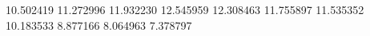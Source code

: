 10.502419
11.272996
11.932230
12.545959
12.308463
11.755897
11.535352
10.183533
8.877166
8.064963
7.378797
